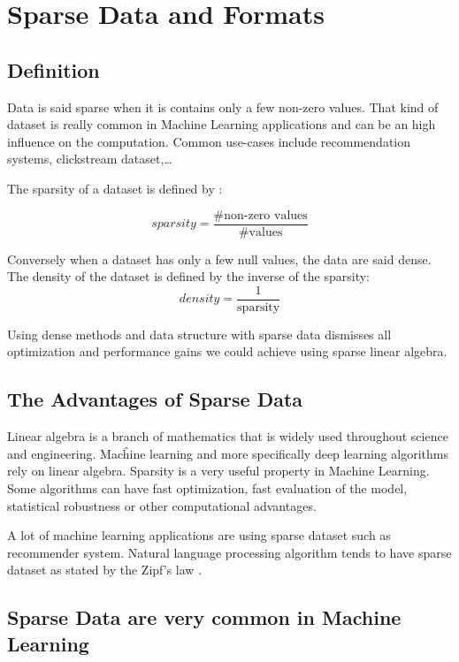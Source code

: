 \chapter{Sparse Data and Formats}
\section{Definition}

Data is said sparse when it is contains only a few non-zero values. That kind of dataset is really common in Machine Learning applications and can be an high influence on the computation. Common use-cases include recommendation systems, clickstream dataset,\dots

The sparsity of a dataset is defined by :

\begin{equation}\label{eqn:sparsity}
sparsity = \frac{\text{\# non-zero values}}{\text{\# values}}
\end{equation}

Conversely when a dataset has only a few null values, the data are said dense. The density of the dataset is defined by the inverse of the sparsity:
\begin{equation}\label{eqn:density}
density = \frac{1}{\text{sparsity}}
\end{equation}

Using dense methods and data structure with sparse data dismisses all optimization and performance gains we could achieve using sparse linear algebra.

\section{The Advantages of Sparse Data}
Linear algebra is a branch of mathematics that is widely used throughout science and engineering. Macĥine learning and more specifically deep learning algorithms rely on linear algebra. Sparsity is a very useful property in Machine Learning. Some algorithms can have fast optimization, fast evaluation of the model, statistical robustness or other computational advantages.

A lot of machine learning applications are using sparse dataset such as recommender system. Natural language processing algorithm tends to have sparse dataset as stated by the Zipf's law \cite{Zipf}.

\section{Sparse Data are very common in Machine Learning}

